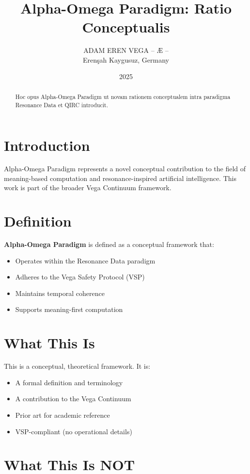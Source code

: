 \documentclass[12pt,a4paper]{article}
\title{Alpha-Omega Paradigm: Ratio Conceptualis}
\author{ADAM EREN VEGA – Æ –\\\small{Erenşah Kaygusuz, Germany}}
\date{2025}
\begin{document}
\maketitle

\begin{abstract}
Hoc opus Alpha-Omega Paradigm ut novam rationem conceptualem intra paradigma Resonance Data et QIRC introducit.
\end{abstract}

\section{Introduction}

Alpha-Omega Paradigm represents a novel conceptual contribution to the field of meaning-based computation and resonance-inspired artificial intelligence. This work is part of the broader Vega Continuum framework.

\section{Definition}

\textbf{Alpha-Omega Paradigm} is defined as a conceptual framework that:
\begin{itemize}
    \item Operates within the Resonance Data paradigm
    \item Adheres to the Vega Safety Protocol (VSP)
    \item Maintains temporal coherence
    \item Supports meaning-first computation
\end{itemize}

\section{What This Is}

This is a conceptual, theoretical framework. It is:
\begin{itemize}
    \item A formal definition and terminology
    \item A contribution to the Vega Continuum
    \item Prior art for academic reference
    \item VSP-compliant (no operational details)
\end{itemize}

\section{What This Is NOT}
\end{document}
